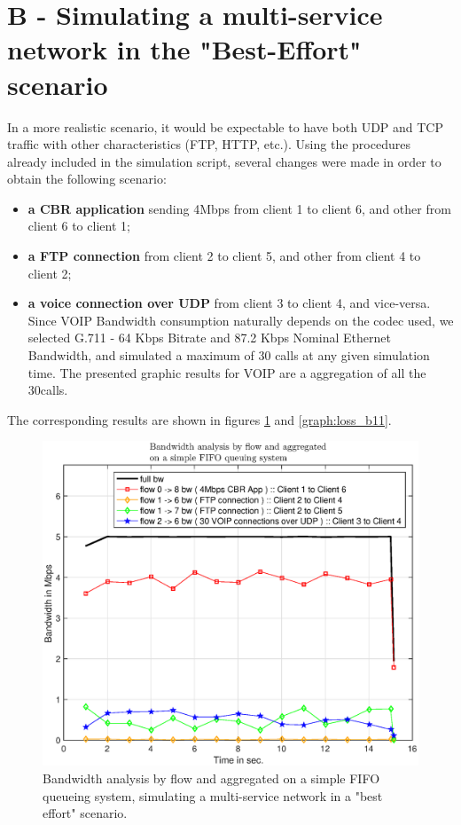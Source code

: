 \documentclass[conference,compsoc]{IEEEtran}
\begin{document}
     \section{B - Simulating a multi-service network in  the "Best-Effort" scenario}
\label{multiservice}


     In a more realistic scenario, it would be expectable to have both UDP and TCP traffic with other characteristics (FTP, HTTP, etc.).
     Using the procedures already included in the simulation script, several changes were made in order to obtain the
     following scenario:
     \begin{itemize}
     \item \textbf{a CBR application} sending 4Mbps from client 1 to client 6, and other from client 6 to client 1;
     \item  \textbf{a FTP connection} from client 2 to client 5, and other from client 4 to client 2;
     \item  \textbf{a voice connection over UDP} from client 3 to client 4, and vice-versa. Since VOIP Bandwidth consumption naturally depends on the codec used, we selected G.711 - 64 Kbps Bitrate and 87.2 Kbps Nominal Ethernet Bandwidth, and simulated a maximum of 30 calls at any given simulation time. The presented graphic results for VOIP are a aggregation of all the 30calls. 
     \end{itemize}
     The corresponding results are shown in figures \ref{graph:bw_b1} and \ref{graph:loss_b11}.

     \begin{figure}[H]
     \centering
     \includegraphics[width=1\columnwidth]{EPS/B/bw_b1.eps}
     \caption{Bandwidth analysis by flow and aggregated on a simple FIFO queueing system, simulating a multi-service network in a "best effort" scenario.}
     \label{graph:bw_b1}
     \end{figure}
\end{document}
